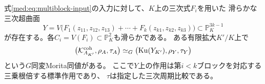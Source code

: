 \begin{theorem}[多ブロック一般点の同変復元]
\label{med:thm:multiblock-generic}
式\eqref{med:eq:multiblock-input}の入力に対して、$K$上の三次式$F_i$を用いた
滑らかな三次超曲面
\begin{equation}\label{med:eq:split-model}
 Y=V\bigl(F_1(z_{11},z_{12},z_{13})+\cdots+
 F_k(z_{k1},z_{k2},z_{k3})\bigr)\subset\mathbb P^{3k-1}_K
\end{equation}
が存在する。各$C_i=V(F_i)\subset\mathbb P^2_K$も滑らかである。
ある有限拡大$K'/K$上で
\begin{equation}\label{med:eq:equivariant-pair}
 \bigl(\mathcal K^{\rm coh}_{A_{K'}},\rho_A,\tau_A\bigr)
 \simeq_G
 \bigl(\operatorname{Ku}(Y_{K'}),\rho_Y,\tau_Y\bigr)
\end{equation}
という$G$同変Morita同値がある。
ここで$Y$上の作用は第$i<k$ブロックを対応する三乗根倍する標準作用であり、
$\tau$は指定した三次周期比較である。
\end{theorem}
